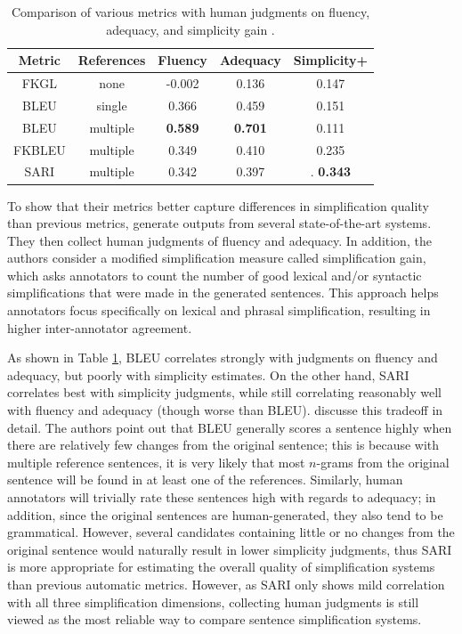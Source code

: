\documentclass[thesis.tex]{subfiles}
\begin{document}
\begin{table}
\begin{center}
\begin{tabular}{|c|c|c|c|c|} \hline
\textbf{Metric} & \textbf{References} & \textbf{Fluency} & \textbf{Adequacy} & \textbf{Simplicity+} \\ \hline
FKGL & none & -0.002 & 0.136 & 0.147 \\
BLEU & single & 0.366 & 0.459 & 0.151 \\
BLEU & multiple &  \textbf{0.589} & \textbf{0.701} & 0.111 \\ \hline
FKBLEU & multiple & 0.349 & 0.410 & 0.235 \\
SARI & multiple & 0.342 & 0.397 &. \textbf{0.343} \\ \hline
\end{tabular}
\end{center}
\caption{\label{tab:sari_results} Comparison of various metrics with human judgments on fluency, adequacy, and simplicity gain \citep{xu2016optimizing}.}
\end{table}

To show that their metrics better capture differences in simplification quality than previous metrics, \cite{xu2016optimizing} generate outputs from several state-of-the-art systems. They then collect human judgments of fluency and adequacy. In addition, the authors consider a modified simplification measure called simplification gain, which asks annotators to count the number of good lexical and/or syntactic simplifications that were made in the generated sentences. This approach helps annotators focus specifically on lexical and phrasal simplification, resulting in higher inter-annotator agreement.

As shown in Table \ref{tab:sari_results}, BLEU correlates strongly with judgments on fluency and adequacy, but poorly with simplicity estimates. On the other hand, SARI correlates best with simplicity judgments, while still correlating reasonably well with fluency and adequacy (though worse than BLEU). \cite{xu2016optimizing} discusse this tradeoff in detail. The authors point out that BLEU generally scores a sentence highly when there are relatively few changes from the original sentence; this is because with multiple reference sentences, it is very likely that most $n$-grams from the original sentence will be found in at least one of the references. Similarly, human annotators will trivially rate these sentences high with regards to adequacy; in addition, since the original sentences are human-generated, they also tend to be grammatical. However, several candidates containing little or no changes from the original sentence would naturally result in lower simplicity judgments, thus SARI is more appropriate for estimating the overall quality of simplification systems than previous automatic metrics. However, as SARI only shows mild correlation with all three simplification dimensions, collecting human judgments is still viewed as the most reliable way to compare sentence simplification systems.
\end{document}

